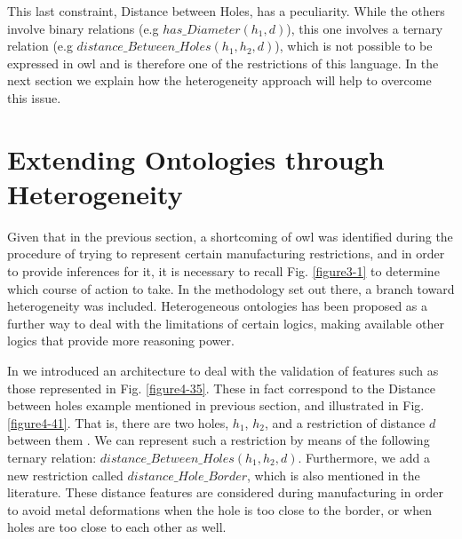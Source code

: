 This last constraint, Distance between  Holes, has a peculiarity. While the others involve binary relations (e.g $has\_Diameter(h_{1},d)$), this one involves a ternary relation (e.g $distance\_Between\_Holes(h_{1},h_{2},d)$), which is not possible to be expressed in \gls{owl} and is therefore one of the restrictions of this language. In the next section we explain how the heterogeneity approach will help to overcome this issue. 


\section{Extending Ontologies through Heterogeneity}\label{section4.5}

Given that in the previous section, a shortcoming of \gls{owl} was identified during the procedure of trying to represent certain manufacturing restrictions, and in order to provide inferences for it, it is necessary to recall  Fig. \ref{figure3-1} to determine which course of action to take. In the methodology set out there, a branch toward heterogeneity was included. Heterogeneous ontologies has been proposed as a further way to deal with the limitations of certain logics, making available other logics that provide more reasoning power.


In \cite{ramos_hetereogeneous_2012}   we introduced an architecture to deal with the validation of features such as those represented in Fig. \ref{figure4-35}. These in fact correspond to the Distance between holes example mentioned in previous section, and illustrated in Fig. \ref{figure4-41}. That is, there are two holes, $h_{1}$, $h_{2}$, and a restriction of distance $d$ between them . We can represent such a restriction by means of the following ternary relation: $distance\_Between\_Holes(h_{1},h_{2},d)$.  Furthermore, we add a new restriction   called $distance\_Hole\_Border$, which is also mentioned in the literature. These distance features are considered during manufacturing in order to avoid metal deformations when the hole is too close to the border, or when holes are too close to each other as well. 


